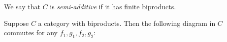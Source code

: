 \noindent We say that $C$ is \emph{semi-additive} if it has finite biproducts.

\begin{proposition}
\label{prop:biproduct:prod-coprod}
Suppose $C$ a category with biproducts. Then the following diagram in $C$ commutes for any $f_1, g_1, f_2,
g_2$:

\begin{center}
\end{center}
\end{proposition}
